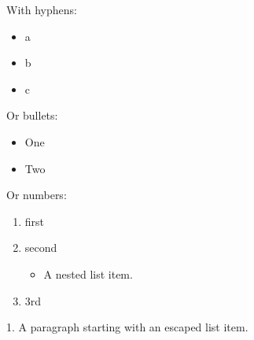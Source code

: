 With hyphens:

\begin{itemize}
\item a
\item b
\item c
\end{itemize}

Or bullets:

\begin{itemize}
\item One
\item Two
\end{itemize}

Or numbers:

\begin{enumerate}
\item first
\item second

\begin{itemize}
\item A nested list item.
\end{itemize}
\item 3rd
\end{enumerate}

1. A paragraph starting with an escaped list item.


